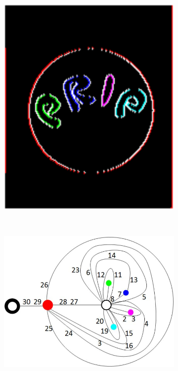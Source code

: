 \documentclass[12pt]{article}
\begin{document}
\begin{figure}[tb]
\begin{subfigure}[b]{0.25\textwidth}
        \includegraphics[width=\textwidth]{img/prip2}
        \caption{}\label{fig:prip2}
    \end{subfigure}
    ~
    \begin{subfigure}[b]{0.4\textwidth}
        \includegraphics[width=\textwidth]{img/prip3}
        \caption{}\label{fig:prip3}
    \end{subfigure}


\end{figure}
\end{document}
